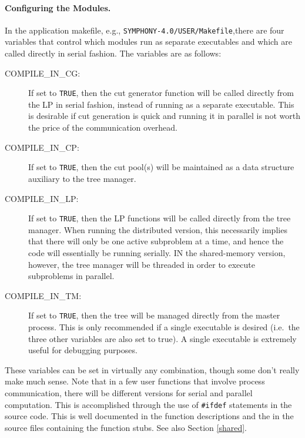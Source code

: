\paragraph{Configuring the Modules.}
\label{configuration}
In the application makefile, e.g., \texttt{SYMPHONY-4.0/USER/Makefile},there
are four variables that control which modules run as separate executables and
which are called directly in serial fashion. The variables are as follows:
\begin{description}
        \item [COMPILE\_IN\_CG:] If set to {\tt TRUE}, then the cut generator
        function will be called directly from the LP in serial
        fashion, instead of running as a separate executable. This is
        desirable if cut generation is quick and running it in
        parallel is not worth the price of the communication overhead.
        \item [COMPILE\_IN\_CP:] If set to {\tt TRUE}, then the cut
        pool(s) will be maintained as a data structure auxiliary to the
        tree manager. 
        \item [COMPILE\_IN\_LP:] If set to {\tt TRUE}, then the LP
        functions will be called directly from the tree manager. When
        running the distributed version, this
        necessarily implies that there will only be one active
        subproblem at a time, and hence the code will essentially be
        running serially. IN the shared-memory version, however, the
        tree manager will be threaded in order to execute subproblems 
        in parallel.
        \item [COMPILE\_IN\_TM:] If set to {\tt TRUE}, then the tree
        will be managed directly from the master process. This is only
        recommended if a single executable is desired (i.e.~the three
        other variables are also set to true). A single executable is
        extremely useful for debugging purposes.
\end{description}
These variables can be set in virtually any combination, though some
don't really make much sense. Note that in a few user functions that
involve process communication, there will be different versions for
serial and parallel computation. This is accomplished through the use
of {\tt \#ifdef} statements in the source code. This is well documented
in the function descriptions and the in the source files containing
the function stubs. See also Section \ref{shared}.

